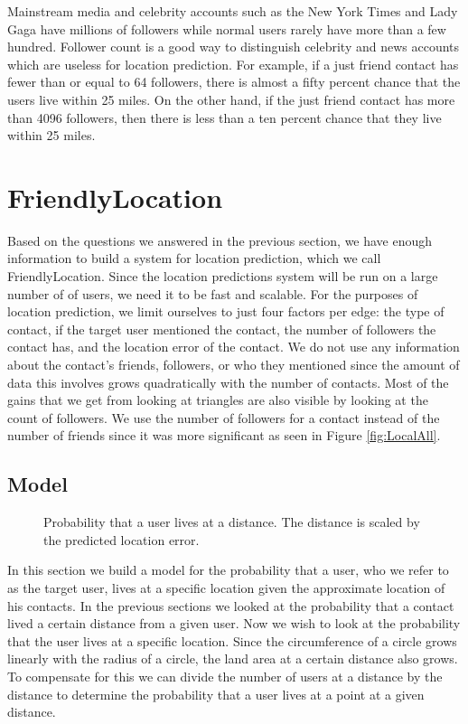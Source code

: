 \documentclass{sig-alternate}
\begin{document}
Mainstream media and celebrity accounts such as the New York Times and Lady Gaga have millions of followers while normal users rarely have more than a few hundred.
Follower count is a good way to distinguish celebrity and news accounts which are useless for location prediction.
For example, if a just friend contact has fewer than or equal to 64 followers, there is almost a fifty percent chance that the users live within 25 miles. On the other hand, if the just friend contact has more than 4096 followers, then there is less than a ten percent chance that they live within 25 miles.

\section{FriendlyLocation}
Based on the questions we answered in the previous section, we have enough
information to build a system for location prediction, which we call FriendlyLocation.
Since the location predictions system will be run on a large number of of users, we need it to be fast and scalable.
For the purposes of location prediction, we limit ourselves to just four factors per edge: the type of contact, if the target user mentioned the contact, the number of followers the contact has, and the location error of the contact.
We do not use any information about the contact's friends, followers, or who they mentioned since the amount of data this involves grows quadratically with the number of contacts.
Most of the gains that we get from looking at triangles are also visible by looking at the count of followers.
We use the number of followers for a contact instead of the number of friends since it was more significant as seen in Figure \ref{fig:LocalAll}.

\subsection{Model}
\label{sec:model}

\begin{figure}
\centering
{}
\caption{Probability that a user lives at a distance. The distance is scaled by the predicted location error.}
\label{fig:EdgeTypesMdist}
\end{figure}

In this section we build a model for the probability that a user, who we refer to as the target user, lives at a specific location given the approximate location of his contacts.
In the previous sections we looked at the probability that a contact lived a certain distance from a given user. Now we wish to look at the probability that the user lives at a specific location. Since the circumference of a circle grows linearly with the radius of a circle, the land area at a certain distance also grows. To compensate for this we can divide the number of users at a distance by the distance to determine the probability that a user lives at a point at a given distance.
\end{document}
